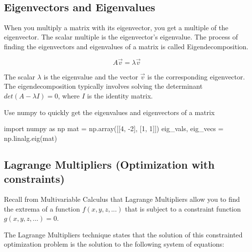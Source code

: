 \documentclass[11pt]{article}
\newenvironment{Shaded}{}{}
\newcommand{\DecValTok}[1]{\textcolor[rgb]{0.25,0.63,0.44}{{#1}}}
\newcommand{\NormalTok}[1]{{#1}}
\newcommand{\ImportTok}[1]{{#1}}
\newcommand{\OperatorTok}[1]{\textcolor[rgb]{0.40,0.40,0.40}{{#1}}}
\begin{document}
    \begin{center}
    \end{center}
    { \hspace*{\fill} \\}
    
    \subsection{Eigenvectors and
Eigenvalues}\label{eigenvectors-and-eigenvalues}

When you multiply a matrix with its eigenvector, you get a multiple of
the eigenvector. The scalar multiple is the eigenvector's eigenvalue.
The process of finding the eigenvectors and eigenvalues of a matrix is
called Eigendecomposition.

\[A \vec{v} = \lambda \vec{v}\]

The scalar \(\lambda\) is the eigenvalue and the vector \(\vec{v}\) is
the corresponding eigenvector. The eigendecomposition typically involves
solving the determinant \(det(A - \lambda I) = 0\), where \(I\) is the
identity matrix.

Use numpy to quickly get the eigenvalues and eigenvectors of a matrix

\begin{Shaded}
\begin{Highlighting}[]
\ImportTok{import}\NormalTok{ numpy }\ImportTok{as}\NormalTok{ np}
\NormalTok{mat }\OperatorTok{=}\NormalTok{ np.array([[}\DecValTok{4}\NormalTok{, }\OperatorTok{{-}}\DecValTok{2}\NormalTok{],}
\NormalTok{                [}\DecValTok{1}\NormalTok{,  }\DecValTok{1}\NormalTok{]])}
\NormalTok{eig\_vals, eig\_vecs }\OperatorTok{=}\NormalTok{ np.linalg.eig(mat)}
\end{Highlighting}
\end{Shaded}

    \subsection{Lagrange Multipliers (Optimization with
constraints)}\label{lagrange-multipliers-optimization-with-constraints}

Recall from Multivariable Calculus that Lagrange Multipliers allow you
to find the extrema of a function \(f(x, y, z, ...)\) that is subject to
a constraint function \(g(x, y, z, ...)=0\).

The Lagrange Multipliers technique states that the solution of this
constrainted optimization problem is the solution to the following
system of equations:
\end{document}
